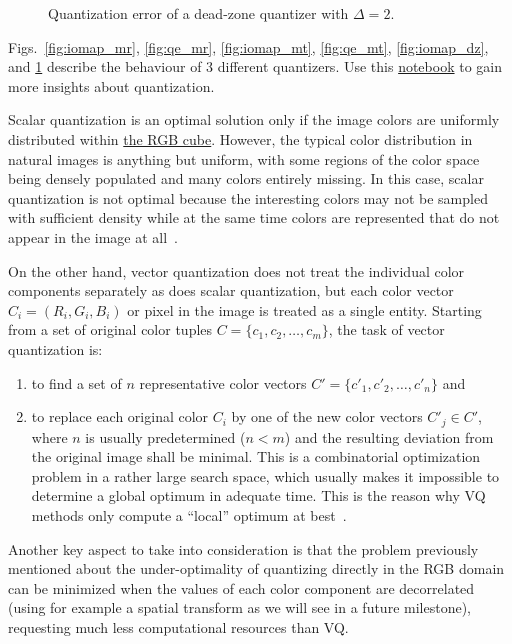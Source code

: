 \begin{figure}
  \centering
  \caption{Quantization error of a dead-zone quantizer with $\Delta=2$.}
  \label{fig:qe_dz}
\end{figure}

Figs.~\ref{fig:iomap_mr}, \ref{fig:qe_mr}, \ref{fig:iomap_mt},
\ref{fig:qe_mt}, \ref{fig:iomap_dz}, and \ref{fig:qe_dz} describe the
behaviour of 3 different quantizers.  Use this
\href{https://github.com/Sistemas-Multimedia/Sistemas-Multimedia.github.io/blob/master/milestones/05-quantization/digital_quantization.ipynb}{notebook}
to gain more insights about quantization.

Scalar quantization is an optimal solution only if the image colors
are uniformly distributed within
\href{https://en.wikipedia.org/wiki/RGB_color_model}{the RGB
  cube}. However, the typical color distribution in natural images is
anything but uniform, with some regions of the color space being
densely populated and many colors entirely missing. In this case,
scalar quantization is not optimal because the interesting colors may
not be sampled with suﬃcient density while at the same time colors are
represented that do not appear in the image at
all~\cite{burger2016digital}.

On the other hand, vector quantization does not treat the individual
color components separately as does scalar quantization, but each
color vector $C_i = (R_i, G_i, B_i )$ or pixel in the image is treated
as a single entity. Starting from a set of original color tuples $C
= \{c_1, c_2, \ldots ,c_m\}$, the task of vector quantization is:
\begin{enumerate}
\item to ﬁnd a set of $n$ representative color vectors $C' = \{c'_1,
  c'_2 ,\ldots , c'_n \}$ and
\item to replace each original color $C_i$ by one of the new color
  vectors $C'_j\in C'$, where $n$ is usually predetermined ($n < m$)
  and the resulting deviation from the original image shall be
  minimal. This is a combinatorial optimization problem in a rather
  large search space, which usually makes it impossible to determine a
  global optimum in adequate time. This is the reason why VQ methods
  only compute a ``local'' optimum at best~\cite{burger2016digital}.
\end{enumerate}

Another key aspect to take into consideration is that the problem
previously mentioned about the under-optimality of quantizing directly
in the RGB domain can be minimized when the values of each color
component are decorrelated (using for example a spatial transform as
we will see in a future milestone), requesting much less computational
resources than VQ.

